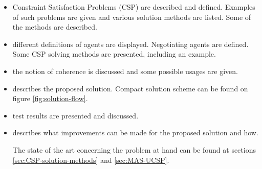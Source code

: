 \documentclass[header]{subfiles}
\begin{document}
\def\inChapter#1{In chapter \ref{chapter:#1}}
\def\showChapter#1{Chapter \ref{chapter:#1}}

\begin{itemize}[leftmargin=2.5cm]
  \item[\inChapter{csp}]
        Constraint Satisfaction Problems (CSP) are described and defined.
        Examples of such problems are given and various solution methods are
        listed. Some of the methods are described.
  \item[\inChapter{agents}]
        different definitions of agents are displayed. Negotiating agents are
        defined. Some CSP solving methods are presented, including an example.
  \item[\inChapter{Coherence}]
        the notion of coherence is discussed and some possible usages are given.
  \item[\showChapter{solution}]
        describes the proposed solution. Compact solution scheme can be found
        on figure \ref{fig:solution-flow}.
  \item[\inChapter{test}] test results are presented and discussed.
  \item[\showChapter{improvements}]
        describes what improvements can be made for the proposed solution and
        how.

\bigskip\noindent
The state of the art concerning the problem at hand can be found at sections
\ref{sec:CSP-solution-methods} and \ref{sec:MAS-UCSP}.

\end{itemize}

\end{document}
